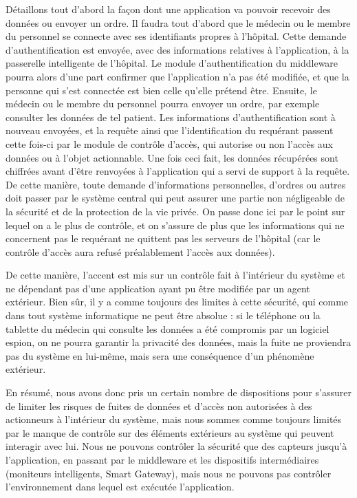 Détaillons tout d’abord la façon dont une application va pouvoir recevoir des données ou envoyer un ordre. Il faudra tout d’abord que le médecin ou le membre du personnel se connecte avec ses identifiants propres à l’hôpital. Cette demande d’authentification est envoyée, avec des informations relatives à l’application, à la passerelle intelligente de l’hôpital. Le module d’authentification du middleware pourra alors d’une part confirmer que l’application n’a pas été modifiée, et que la personne qui s’est connectée est bien celle qu’elle prétend être. Ensuite, le médecin ou le membre du personnel pourra envoyer un ordre, par exemple consulter les données de tel patient. Les informations d’authentification sont à nouveau envoyées, et la requête ainsi que l’identification du requérant passent cette fois-ci par le module de contrôle d’accès, qui autorise ou non l’accès aux données ou à l’objet actionnable. Une fois ceci fait, les données récupérées sont chiffrées avant d’être renvoyées à l’application qui a servi de support à la requête. De cette manière, toute demande d’informations personnelles, d’ordres ou autres doit passer par le système central qui peut assurer une partie non négligeable de la sécurité et de la protection de la vie privée. On passe donc ici par le point sur lequel on a le plus de contrôle, et on s’assure de plus que les informations qui ne concernent pas le requérant ne quittent pas les serveurs de l’hôpital (car le contrôle d’accès aura refusé préalablement l’accès aux données).

De cette manière, l’accent est mis sur un contrôle fait à l’intérieur du système et ne dépendant pas d’une application ayant pu être modifiée par un agent extérieur. Bien sûr, il y a comme toujours des limites à cette sécurité, qui comme dans tout système informatique ne peut être absolue : si le téléphone ou la tablette du médecin qui consulte les données a été compromis par un logiciel espion, on ne pourra garantir la privacité des données, mais la fuite ne proviendra pas du système en lui-même, mais sera une conséquence d’un phénomène extérieur.

En résumé, nous avons donc pris un certain nombre de dispositions pour s’assurer de limiter les risques de fuites de données et d’accès non autorisées à des actionneurs à l’intérieur du système, mais nous sommes comme toujours limités par le manque de contrôle sur des éléments extérieurs au système qui peuvent interagir avec lui. Nous ne pouvons contrôler la sécurité que des capteurs jusqu’à l’application, en passant par le middleware et les dispositifs intermédiaires (moniteurs intelligents, Smart Gateway), mais nous ne pouvons pas contrôler l’environnement dans lequel est exécutée l’application.
